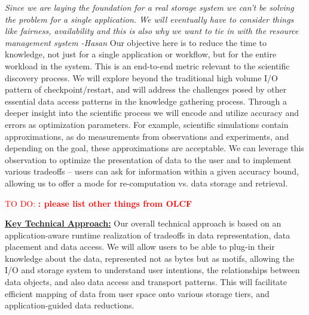 \documentclass[11pt,letterpaper]{article}
\newcommand{\hasan}[1]{{\it \color{darkgreen} #1 -Hasan }}
\newcommand{\TODO}[1]{\textcolor{red}{ TO DO: #1 }}
\newcommand{\TODO}[1]{}
\newcommand{\hasan}[1]{}
\begin{document}
\hasan{Since we are laying the foundation for a real storage system we can't
  be solving the problem for a single application. We will eventually have
  to consider things like fairness, availability and this is also why we
  want to tie in with the resource management system} 
%
Our objective here is to reduce the time to knowledge, not just for a single
application or workflow, but for the entire workload in the system. This is
an end-to-end metric relevant to the scientific discovery process. We will
explore beyond the traditional high volume I/O pattern of
checkpoint/restart, and will address the challenges posed by other essential
data access patterns in the knowledge gathering process.  Through a deeper
insight into the scientific process we will encode and utilize accuracy and
errors as optimization parameters.  For example, scientific simulations
contain approximations, as do measurements from observations and
experiments, and depending on the goal, these approximations are
acceptable. We can leverage this observation to optimize the presentation of
data to the user and to implement various tradeoffs -- users can ask for
information within a given accuracy bound, allowing us to offer a mode for
re-computation vs. data storage and retrieval.

%  
\TODO{\bf: please list other things from OLCF}
% 


\underline{\textbf{Key Technical Approach:}}
Our overall technical approach is based on an application-aware runtime
realization of tradeoffs in data representation, data placement and data
access. We will allow users to be able to plug-in their knowledge 
about the data, represented not as bytes but as motifs, allowing the I/O and 
storage system to understand user
intentions, the relationships between data objects, and also data access
and transport patterns. This will facilitate efficient mapping of data from
user space onto various storage tiers, and application-guided
data reductions.
\end{document}
